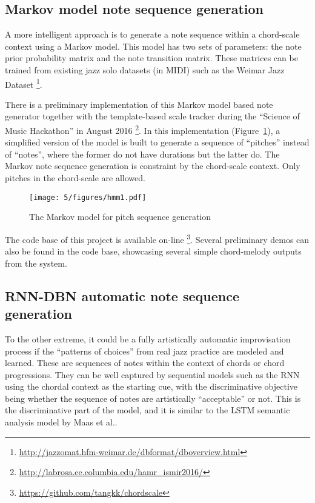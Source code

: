 \subsection{Markov model note sequence generation}
A more intelligent approach is to generate a note sequence within a chord-scale context using a Markov model. This model has two sets of parameters: the note prior probability matrix and the note transition matrix. These matrices can be trained from existing jazz solo datasets (in MIDI) such as the Weimar Jazz Dataset \footnote{\url{http://jazzomat.hfm-weimar.de/dbformat/dboverview.html}}\cite{abesser2013introducing}.

There is a preliminary implementation of this Markov model based note generator together with the template-based scale tracker during the ``Science of Music Hackathon'' in August 2016 \footnote{\url{http://labrosa.ee.columbia.edu/hamr\_ismir2016/}}. In this implementation (Figure~\ref{fig:5-hmm1}), a simplified version of the model is built to generate a sequence of ``pitches'' instead of ``notes'', where the former do not have durations but the latter do. The Markov note sequence generation is constraint by the chord-scale context. Only pitches in the chord-scale are allowed.

\begin{figure}[htb]
    \centering
        \texttt{[image: 5/figures/hmm1.pdf]}
    \caption{The Markov model for pitch sequence generation}
    \label{fig:5-hmm1}
\end{figure}

The code base of this project is available on-line \footnote{\url{https://github.com/tangkk/chordscale}}. Several preliminary demos can also be found in the code base, showcasing several simple chord-melody outputs from the system.

\subsection{RNN-DBN automatic note sequence generation}
To the other extreme, it could be a fully artistically automatic improvisation process if the ``patterns of choices'' from real jazz practice \cite{jazzguitarimpro,pracjazz} are modeled and learned. These are sequences of notes within the context of chords or chord progressions. They can be well captured by sequential models such as the RNN using the chordal context as the starting cue, with the discriminative objective being whether the sequence of notes are artistically ``acceptable'' or not. This is the discriminative part of the model, and it is similar to the LSTM semantic analysis model by Maas et al.\cite{maas2011learning}.

